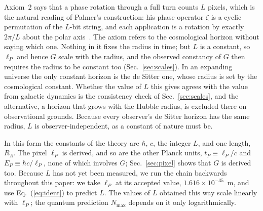 \documentclass[aps,prd,twocolumn,superscriptaddress,nofootinbib,showkeys]{revtex4-2}
\begin{document}
Axiom~2 says that a phase rotation through a full turn counts $L$ pixels, which is the natural reading of Palmer's construction: his phase operator $\zeta$ is a cyclic permutation of the $L$-bit string, and each application is a rotation by exactly $2\pi/L$ about the polar axis~\cite{palmer2026}. The axiom refers to the cosmological horizon without saying which one. Nothing in it fixes the radius in time; but $L$ is a constant, so $\ell_P$ and hence $G$ scale with the radius, and the observed constancy of $G$ then requires the radius to be constant too (Sec.~\ref{sec:scales}). In an expanding universe the only constant horizon is the de Sitter one, whose radius is set by the cosmological constant. Whether the value of $L$ this gives agrees with the value from galactic dynamics is the consistency check of Sec.~\ref{sec:scales}, and the alternative, a horizon that grows with the Hubble radius, is excluded there on observational grounds. Because every observer's de Sitter horizon has the same radius, $L$ is observer-independent, as a constant of nature must be.

In this form the constants of the theory are $\hbar$, $c$, the integer $L$, and one length, $R_\Lambda$. The pixel $\ell_P$ is derived, and so are the other Planck units, $t_P \equiv \ell_P/c$ and $E_P \equiv \hbar c/\ell_P$, none of which involves $G$; Sec.~\ref{sec:pixel} shows that $G$ is derived too. Because $L$ has not yet been measured, we run the chain backwards throughout this paper: we take $\ell_P$ at its accepted value, $1.616\times10^{-35}$~m, and use Eq.~(\ref{eq:ident}) to predict $L$. The values of $L$ obtained this way scale linearly with $\ell_P$; the quantum prediction $N_{\max}$ depends on it only logarithmically.
\end{document}
